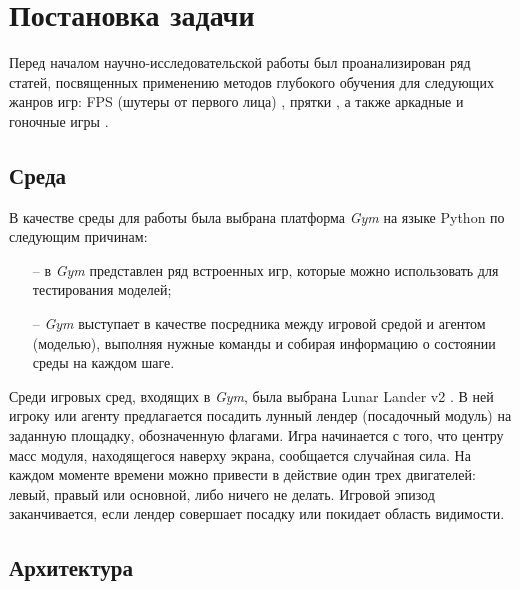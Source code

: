 \begingroup
\titleformat{\chapter}{\normalfont\centering}{\chaptertitlename \thechapter}{14pt}{}
\titlespacing*{\chapter}{0pt}{-50pt}{0pt}

\chapter{Постановка задачи}
\label{cha:analysis}
%
%

Перед началом научно-исследовательской работы был проанализирован ряд статей, посвященных применению методов глубокого обучения для следующих жанров игр: FPS (шутеры от первого лица) \cite{bergdahl2020augmenting}, прятки \cite{baker2019emergent}, а также аркадные и гоночные игры \cite{tufano2022using}.

\section{Среда}

В качестве среды для работы была выбрана платформа \textit{Gym} на языке Python \cite{Gym} по следующим причинам:
\begin{itemize}
	\item[--] в \textit{Gym} представлен ряд встроенных игр, которые можно использовать для тестирования моделей;
	\item[--] \textit{Gym} выступает в качестве посредника между игровой средой и агентом (моделью), выполняя нужные команды и собирая информацию о состоянии среды на каждом шаге.
\end{itemize}

Среди игровых сред, входящих в \textit{Gym}, была выбрана Lunar Lander v2 \cite{lunarlanderv2}. В ней игроку или агенту предлагается посадить лунный лендер (посадочный модуль) на заданную площадку, обозначенную флагами. Игра начинается с того, что центру масс модуля, находящегося наверху экрана, сообщается случайная сила. На каждом моменте времени можно привести в действие один трех двигателей: левый, правый или основной, либо ничего не делать. Игровой эпизод заканчивается, если лендер совершает посадку или покидает область видимости.

\section{Архитектура}


